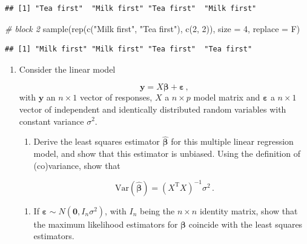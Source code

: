 \documentclass[
]{book}
\newenvironment{Shaded}{\begin{snugshade}}{\end{snugshade}}
\newcommand{\AttributeTok}[1]{\textcolor[rgb]{0.77,0.63,0.00}{#1}}
\newcommand{\CommentTok}[1]{\textcolor[rgb]{0.56,0.35,0.01}{\textit{#1}}}
\newcommand{\DecValTok}[1]{\textcolor[rgb]{0.00,0.00,0.81}{#1}}
\newcommand{\FunctionTok}[1]{\textcolor[rgb]{0.00,0.00,0.00}{#1}}
\newcommand{\NormalTok}[1]{#1}
\newcommand{\StringTok}[1]{\textcolor[rgb]{0.31,0.60,0.02}{#1}}
\providecommand{\tightlist}{%
  \setlength{\itemsep}{0pt}\setlength{\parskip}{0pt}}
\theoremstyle{definition}
\theoremstyle{definition}
\theoremstyle{definition}
\theoremstyle{definition}
\theoremstyle{remark}
\begin{document}
\begin{enumerate}
\begin{verbatim}
## [1] "Tea first"  "Milk first" "Tea first"  "Milk first"
\end{verbatim}

\begin{Shaded}
\begin{Highlighting}[]
\CommentTok{\# block 2}
\FunctionTok{sample}\NormalTok{(}\FunctionTok{rep}\NormalTok{(}\FunctionTok{c}\NormalTok{(}\StringTok{"Milk first"}\NormalTok{, }\StringTok{"Tea first"}\NormalTok{), }\FunctionTok{c}\NormalTok{(}\DecValTok{2}\NormalTok{, }\DecValTok{2}\NormalTok{)), }\AttributeTok{size =} \DecValTok{4}\NormalTok{, }\AttributeTok{replace =}\NormalTok{ F)}
\end{Highlighting}
\end{Shaded}

\begin{verbatim}
## [1] "Milk first" "Milk first" "Tea first"  "Tea first"
\end{verbatim}
\end{enumerate}

\begin{enumerate}
\def\labelenumi{\arabic{enumi}.}
\setcounter{enumi}{1}
\item
  Consider the linear model

  \[\boldsymbol{y}= X\boldsymbol{\beta}+ \boldsymbol{\varepsilon}\,,\]
  with \(\boldsymbol{y}\) an \(n\times 1\) vector of responses, \(X\) a \(n\times p\) model matrix and \(\boldsymbol{\varepsilon}\) a \(n\times 1\) vector of independent and identically distributed random variables with constant variance \(\sigma^2\).

  \begin{enumerate}
  \def\labelenumii{\alph{enumii}.}
  \tightlist
  \item
    Derive the least squares estimator \(\hat{\boldsymbol{\beta}}\) for this multiple linear regression model, and show that this estimator is unbiased. Using the definition of (co)variance, show that
  \end{enumerate}

  \[\mbox{Var}(\hat{\boldsymbol{\beta}}) = \left(X^{\mathrm{T}}X\right)^{-1}\sigma^2\,.\]

  \begin{enumerate}
  \def\labelenumii{\alph{enumii}.}
  \setcounter{enumii}{1}
  \tightlist
  \item
    If \(\boldsymbol{\varepsilon}\sim N (\boldsymbol{0},I_n\sigma^2)\), with \(I_n\) being the \(n\times n\) identity matrix, show that the maximum likelihood estimators for \(\boldsymbol{\beta}\) coincide with the least squares estimators.
  \end{enumerate}
\end{enumerate}
\end{document}
